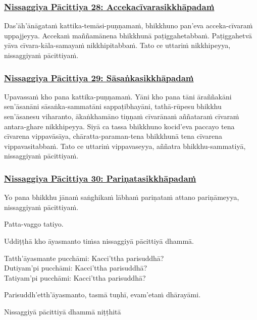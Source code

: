 \subsubsection*{\hyperref[forf-exp28]{Nissaggiya Pācittiya 28: Accekacīvarasikkhāpadaṁ}}
\label{np28}

Das'āh'ānāgataṁ kattika-temāsi-puṇṇamaṁ, bhikkhuno pan’eva acceka-cīvaraṁ uppajjeyya. Accekaṁ maññamānena bhikkhunā paṭiggahetabbaṁ. Paṭiggahetvā yāva cīvara-kāla-samayaṁ nikkhipitabbaṁ. Tato ce uttariṁ nikkhipeyya, nissaggiyaṁ pācittiyaṁ.

\subsubsection*{\hyperref[forf-exp29]{Nissaggiya Pācittiya 29: Sāsaṅkasikkhāpadaṁ}}
\label{np29}

Upavassaṁ kho pana kattika-puṇṇamaṁ. Yāni kho pana tāni āraññakāni sen'āsanāni sāsaṅka-sammatāni sappaṭibhayāni, tathā-rūpesu bhikkhu sen'āsanesu viharanto, ākaṅkhamāno tiṇṇaṁ cīvarānaṁ aññataraṁ cīvaraṁ antara-ghare nikkhipeyya. Siyā ca tassa bhikkhuno kocid’eva paccayo tena cīvarena vippavāsāya, chāratta-paraman-tena bhikkhunā tena cīvarena vippavasitabbaṁ. Tato ce uttariṁ vippavaseyya, aññatra bhikkhu-sammatiyā, nissaggiyaṁ pācittiyaṁ.

\subsubsection*{\hyperref[forf-exp30]{Nissaggiya Pācittiya 30: Pariṇatasikkhāpadaṁ}}
\label{np30}

Yo pana bhikkhu jānaṁ saṅghikaṁ lābhaṁ pariṇataṁ attano pariṇāmeyya, nissaggiyaṁ pācittiyaṁ.

\begin{center}
  Patta-vaggo tatiyo.
\end{center}

\medskip

\begin{center}
Uddiṭṭhā kho āyasmanto tiṁsa nissaggiyā pācittiyā dhammā.

\smallskip

Tatth'āyasmante pucchāmi: Kacci'ttha parisuddhā?\\
Dutiyam'pi pucchāmi: Kacci'ttha parisuddhā?\\
Tatiyam'pi pucchāmi: Kacci'ttha parisuddhā?

\smallskip

Parisuddh'etth'āyasmanto, tasmā tuṇhī, evam'etaṁ dhārayāmi.
\end{center}

\begin{outro}
  Nissaggiyā pācittiyā dhammā niṭṭhitā
\end{outro}

\clearpage
